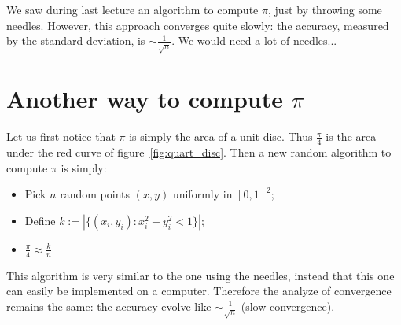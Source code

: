 We saw during last lecture an algorithm to compute $\pi$, just by throwing some needles. However, this approach converges quite slowly: the accuracy, measured by the standard deviation, is $\sim \frac{1}{\sqrt{n}}$. We would need a lot of needles...

\section{Another way to compute $\pi$}

Let us first notice that $\pi$ is simply the area of a unit disc. Thus $\frac{\pi}{4}$ is the area under the red curve of figure~\ref{fig:quart_disc}. Then a new random algorithm to compute $\pi$ is simply:
\begin{itemize}
	\item Pick $n$ random points $(x,y)$ uniformly in $[0,1]^2$;
	\item Define $k:=|\{(x_i,y_i):x_i^2+y_i^2<1\}|$;
	\item $\frac{\pi}{4}\approx \frac{k}{n}$
\end{itemize}

This algorithm is very similar to the one using the needles, instead that this one can easily be implemented on a computer. Therefore the analyze of convergence remains the same: the accuracy evolve like $\sim \frac{1}{\sqrt{n}}$ (slow convergence).

\begin{figure}[h!]%
    \centering
    ~
		\\
		\caption{} 
		\label{fig:compute_pi}
\end{figure}

